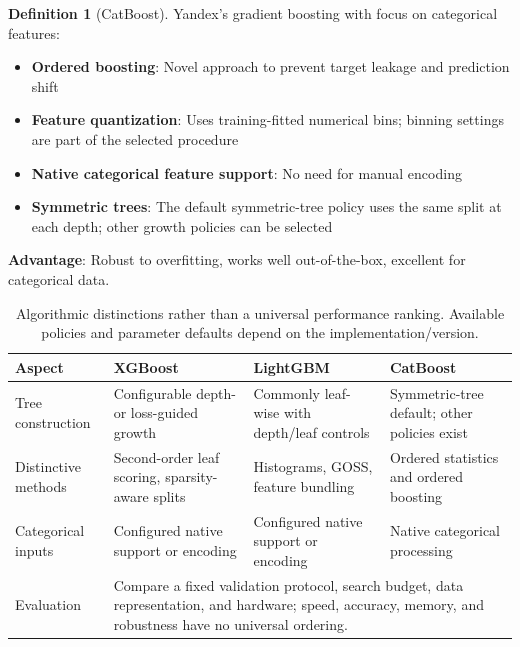 \documentclass[11pt,twoside]{article}
\numberwithin{equation}{section}
\theoremstyle{plain}
\theoremstyle{definition}
\newtheorem{definition}[theorem]{Definition}
\theoremstyle{remark}
\begin{document}
\begin{definition}[CatBoost]
Yandex's gradient boosting with focus on categorical features:

\begin{itemize}
\item \textbf{Ordered boosting}: Novel approach to prevent target leakage and prediction shift
\item \textbf{Feature quantization}: Uses training-fitted numerical bins; binning settings are part of the selected procedure
\item \textbf{Native categorical feature support}: No need for manual encoding
\item \textbf{Symmetric trees}: The default symmetric-tree policy uses the same split at each depth; other growth policies can be selected
\end{itemize}

\textbf{Advantage}: Robust to overfitting, works well out-of-the-box, excellent for categorical data.
\end{definition}

\begin{table}[H]
\centering\small
\begin{tabular}{@{}p{2.3cm}p{3.7cm}p{3.7cm}p{3.7cm}@{}}
\toprule
Aspect & XGBoost & LightGBM & CatBoost\\\midrule
Tree construction & Configurable depth- or loss-guided growth & Commonly leaf-wise with depth/leaf controls & Symmetric-tree default; other policies exist\\
Distinctive methods & Second-order leaf scoring, sparsity-aware splits & Histograms, GOSS, feature bundling & Ordered statistics and ordered boosting\\
Categorical inputs & Configured native support or encoding & Configured native support or encoding & Native categorical processing\\
Evaluation & \multicolumn{3}{p{11.5cm}}{Compare a fixed validation protocol, search budget, data representation, and hardware; speed, accuracy, memory, and robustness have no universal ordering.}\\
\bottomrule\end{tabular}
\caption{Algorithmic distinctions rather than a universal performance ranking. Available policies and parameter defaults depend on the implementation/version.}
\end{table}
\end{document}
